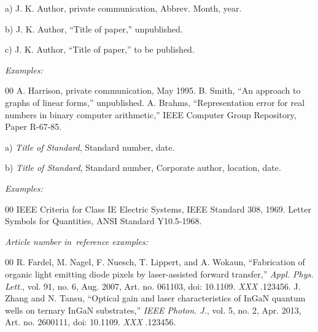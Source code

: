 \documentclass[journal,onecolumn,web]{ieeecolor}
\begin{document}

\noindent a) J. K. Author, private communication, Abbrev. Month, year.

\noindent b) J. K. Author, ``Title of paper,'' unpublished.

\noindent c) J. K. Author, ``Title of paper,'' to be published.

{\it Examples:}{\vadjust{\vspace*{-2.5em}}}

\begin{thebibliography}{00}
 A. Harrison, private communication, May 1995.
 B. Smith, ``An approach to graphs of linear forms,'' unpublished.
 A. Brahms, ``Representation error for real numbers in binary computer arithmetic,'' IEEE Computer Group Repository, Paper R-67-85.
\end{thebibliography}


\noindent a) {\it Title of Standard}, Standard number, date.

\noindent b) {\it Title of Standard}, Standard number, Corporate author, location, date.

{\it Examples:}{\vadjust{\vspace*{-2.5em}}}

\begin{thebibliography}{00}
 IEEE Criteria for Class IE Electric Systems, IEEE Standard 308, 1969.
 Letter Symbols for Quantities, ANSI Standard Y10.5-1968.
\end{thebibliography}

{\it Article number in~reference examples:}{\vadjust{\vspace*{-2.5em}}}

\begin{thebibliography}{00}
 R. Fardel, M. Nagel, F. Nuesch, T. Lippert, and A. Wokaun, ``Fabrication of organic light emitting diode pixels by laser-assisted forward transfer,'' {\it Appl. Phys. Lett.}, vol. 91, no. 6, Aug. 2007, Art. no. 061103, doi:  {10.1109.} {{\it XXX}} {.123456}.
 J. Zhang and N. Tansu, ``Optical gain and laser characteristics of InGaN quantum wells on ternary InGaN substrates,'' {\it IEEE Photon. J.}, vol. 5, no. 2, Apr. 2013, Art. no. 2600111, doi:  {10.1109.} {{\it XXX}} {.123456}.
\end{thebibliography}
\end{document}
